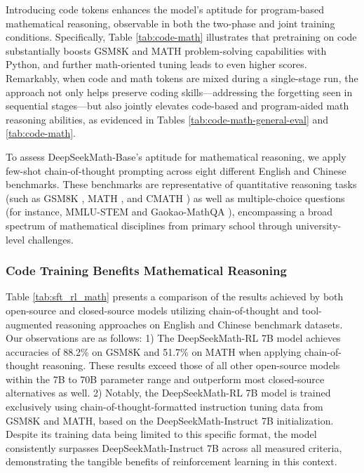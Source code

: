 Introducing code tokens enhances the model’s aptitude for program-based mathematical reasoning, observable in both the two-phase and joint training conditions. Specifically, Table \ref{tab:code-math} illustrates that pretraining on code substantially boosts GSM8K and MATH problem-solving capabilities with Python, and further math-oriented tuning leads to even higher scores. Remarkably, when code and math tokens are mixed during a single-stage run, the approach not only helps preserve coding skills—addressing the forgetting seen in sequential stages—but also jointly elevates code-based and program-aided math reasoning abilities, as evidenced in Tables \ref{tab:code-math-general-eval} and \ref{tab:code-math}.

To assess DeepSeekMath-Base's aptitude for mathematical reasoning, we apply few-shot chain-of-thought prompting \citep{cot} across eight different English and Chinese benchmarks. These benchmarks are representative of quantitative reasoning tasks (such as GSM8K \citep{gsm8k}, MATH \citep{MATH}, and CMATH \citep{wei2023cmath}) as well as multiple-choice questions (for instance, MMLU-STEM \citep{mmlu} and Gaokao-MathQA \citep{agieval}), encompassing a broad spectrum of mathematical disciplines from primary school through university-level challenges.

\subsubsection{Code Training Benefits Mathematical Reasoning}

Table \ref{tab:sft_rl_math} presents a comparison of the results achieved by both open-source and closed-source models utilizing chain-of-thought and tool-augmented reasoning approaches on English and Chinese benchmark datasets. Our observations are as follows: 1) The DeepSeekMath-RL 7B model achieves accuracies of 88.2\% on GSM8K and 51.7\% on MATH when applying chain-of-thought reasoning. These results exceed those of all other open-source models within the 7B to 70B parameter range and outperform most closed-source alternatives as well. 2) Notably, the DeepSeekMath-RL 7B model is trained exclusively using chain-of-thought-formatted instruction tuning data from GSM8K and MATH, based on the DeepSeekMath-Instruct 7B initialization. Despite its training data being limited to this specific format, the model consistently surpasses DeepSeekMath-Instruct 7B across all measured criteria, demonstrating the tangible benefits of reinforcement learning in this context.

